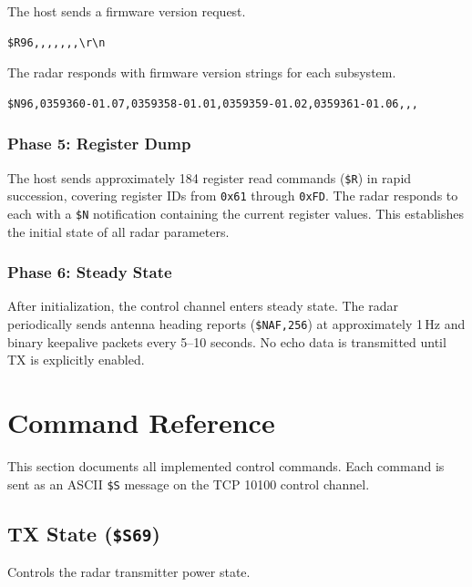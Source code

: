 \documentclass[11pt,letterpaper]{article}
\begin{document}
The host sends a firmware version request.

\begin{lstlisting}
$R96,,,,,,,\r\n
\end{lstlisting}

The radar responds with firmware version strings for each subsystem.

\begin{lstlisting}
$N96,0359360-01.07,0359358-01.01,0359359-01.02,0359361-01.06,,,
\end{lstlisting}


\subsubsection{Phase 5: Register Dump}

The host sends approximately 184 register read commands (\texttt{\$R}) in rapid succession, covering register IDs from \texttt{0x61} through \texttt{0xFD}. The radar responds to each with a \texttt{\$N} notification containing the current register values. This establishes the initial state of all radar parameters.

\subsubsection{Phase 6: Steady State}

After initialization, the control channel enters steady state. The radar periodically sends antenna heading reports (\texttt{\$NAF,256}) at approximately 1\,Hz and binary keepalive packets every 5--10 seconds. No echo data is transmitted until TX is explicitly enabled.


\section{Command Reference}

This section documents all implemented control commands. Each command is sent as an ASCII \texttt{\$S} message on the TCP 10100 control channel.

\subsection{TX State (\texttt{\$S69})}

Controls the radar transmitter power state.
\end{document}
